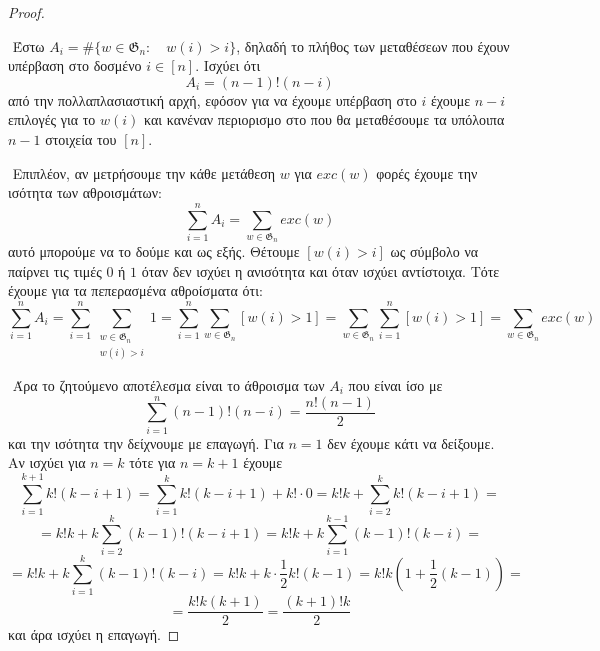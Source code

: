 \documentclass[oneside,a4paper]{article}
\begin{document}
\vspace*{1cm}
\begin{proof} $ $

	$ $\newline
	Έστω $A_i = \# \{w \in \mathfrak{G}_n: \quad w(i) > i\}$, δηλαδή το πλήθος των μεταθέσεων που έχουν υπέρβαση στο δοσμένο $i \in [n]$. Ισχύει ότι $$A_i = (n-1)! (n-i)$$ από την πολλαπλασιαστική αρχή, εφόσον για να έχουμε υπέρβαση στο $i$ έχουμε $n-i$ επιλογές για το $w(i)$ και κανέναν περιορισμο στο που θα μεταθέσουμε τα υπόλοιπα $n-1$ στοιχεία του $[n]$.

	$ $\newline
	Επιπλέον, αν μετρήσουμε την κάθε μετάθεση $w$ για $exc(w)$ φορές έχουμε την ισότητα των αθροισμάτων: $$\sum\limits_{i=1}^n A_i = \sum\limits_{ w \in \mathfrak{G}_n} exc(w)$$ αυτό μπορούμε να το δούμε και ως εξής. Θέτουμε $[w(i)>i]$ ως σύμβολο να παίρνει τις τιμές $0$ ή $1$ όταν δεν ισχύει η ανισότητα και όταν ισχύει αντίστοιχα. Τότε έχουμε για τα πεπερασμένα αθροίσματα ότι: $$\sum\limits_{i=1}^n A_i = \sum\limits_{i=1}^n \sum\limits_{\substack{w \in \mathfrak{G}_n \\ w(i) > i}} 1 = \sum\limits_{i=1}^n \sum\limits_{w\in \mathfrak{G}_n} [w(i)>1] = \sum\limits_{w \in \mathfrak{G}_n} \sum\limits_{i = 1}^n [w(i)>1] = \sum\limits_{w \in \mathfrak{G}_n} exc(w)$$

	$ $\newline
	Άρα το ζητούμενο αποτέλεσμα είναι το άθροισμα των $A_i$ που είναι ίσο με $$\sum\limits_{i=1}^n (n-1)! (n-i) = \frac{ n! (n-1)}{2}$$ και την ισότητα την δείχνουμε με επαγωγή. Για $n=1$ δεν έχουμε κάτι να δείξουμε. Αν ισχύει για $n=k$ τότε για $n=k+1$ έχουμε 
	$$\sum\limits_{i=1}^{k+1} k! (k-i +1) = \sum\limits_{i=1}^k k! (k-i+1) + k!\cdot 0= k!k + \sum\limits_{i=2}^k k!(k-i+1) = $$
	$$ = k!k + k \sum\limits_{i=2}^k (k-1)!(k-i+1) = k!k + k \sum\limits_{i=1}^{k-1} (k-1)!(k-i) = $$
	$$ = k!k + k \sum\limits_{i=1}^{k} (k-1)!(k-i) = k!k + k \cdot \frac12 k!(k-1) = k!k \left(1 + \frac12 (k-1)\right) =$$
	$$ = \frac{k! k (k+1)}2 = \frac{(k+1)!k}2$$ και άρα ισχύει η επαγωγή.

\end{proof}
\end{document}
